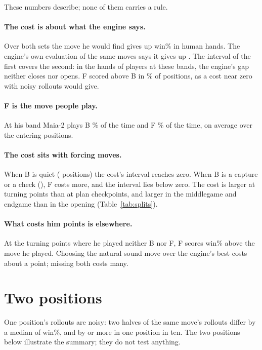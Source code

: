 \documentclass[11pt]{article}
\begin{document}
\SplitTable

These numbers describe; none of them carries a rule.

\paragraph{The cost is about what the engine says.} Over both sets the move he would find
gives up \MinusDF{} win\% in human hands. The engine's own evaluation of the same moves says it
gives up \RootGap. The interval of the first covers the second: in the hands of players at these
bands, the engine's gap neither closes nor opens. F scored above B in \FAheadPct\% of positions,
as a cost near zero with noisy rollouts would give.

\paragraph{F is the move people play.} At his band Maia-2 plays B \PBestPct\% of the time and F
\PFindPct\% of the time, on average over the entering positions.

\paragraph{The cost sits with forcing moves.} When B is quiet (\QuietN{} positions) the cost's
interval reaches zero. When B is a capture or a check (\ForcingN), F costs more, and the interval
lies below zero. The cost is larger at turning points than at plan checkpoints, and larger in the
middlegame and endgame than in the opening (Table~\ref{tab:splits}).

\paragraph{What costs him points is elsewhere.} At the \FOverPN{} turning points where he played
neither B nor F, F scores \FOverP{} win\% above the move he played. Choosing the natural sound
move over the engine's best costs about a point; missing both costs many.

\section{Two positions}

One position's rollouts are noisy: two halves of the same move's rollouts differ by a median of
\HalvesMedian{} win\%, and by \HalvesNinety{} or more in one position in ten. The two positions
below illustrate the summary; they do not test anything.
\end{document}
